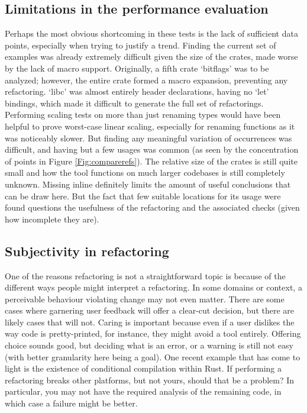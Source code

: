 \subsection{Limitations in the performance evaluation}
Perhaps the most obvious shortcoming in these tests is the lack of sufficient data points, especially when trying to justify a trend. Finding the current set of examples was already extremely difficult given the size of the crates, made worse by the lack of macro support. Originally, a fifth crate `bitflags' was to be analyzed; however, the entire crate formed a macro expansion, preventing any refactoring. `libc' was almost entirely header declarations, having no `let' bindings, which made it difficult to generate the full set of refactorings. Performing scaling tests on more than just renaming types would have been helpful to prove worst-case linear scaling, especially for renaming functions as it was noticeably slower. But finding any meaningful variation of occurrences was difficult, and having but a few usages was common (as seen by the concentration of points in Figure \ref{Fig:comparerefs}). The relative size of the crates is still quite small and how the tool functions on much larger codebases is still completely unknown. Missing inline definitely limits the amount of useful conclusions that can be draw here. But the fact that few suitable locations for its usage were found questions the usefulness of the refactoring and the associated checks (given how incomplete they are). 

\subsection{Subjectivity in refactoring}
One of the reasons refactoring is not a straightforward topic is because of the different ways people might interpret a refactoring. In some domains or context, a perceivable behaviour violating change may not even matter. There are some cases where garnering user feedback will offer a clear-cut decision, but there are likely cases that will not. Caring is important because even if a user dislikes the way code is pretty-printed, for instance, they might avoid a tool entirely. Offering choice sounds good, but deciding what is an error, or a warning is still not easy (with better granularity here being a goal). One recent example that has come to light is the existence of conditional compilation within Rust. If performing a refactoring breaks other platforms, but not yours, should that be a problem? In particular, you may not have the required analysis of the remaining code, in which case a failure might be better.


